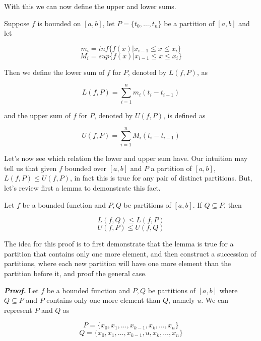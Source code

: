 \documentclass{report}
\begin{document}

    With this we can now define the upper and lower sums.

    \begin{defBox}
        Suppose $f$ is bounded on $[a,b]$, let $P = \{t_0,\dots,t_n\}$ be a partition of $[a,b]$ and let

        $$m_i = inf\{f(x) | x_{i-1} \leq x \leq x_i\}$$
        $$M_i = sup\{f(x) | x_{i-1} \leq x \leq x_i\}$$

        Then we define the lower sum of $f$ for $P$, denoted by $L(f, P)$, as

        $$L(f, P) = \sum_{i=1}^{n}m_i(t_{i} - t_{i-1})$$

        and the upper sum of $f$ for $P$, denoted by $U(f, P)$, is defined as

        $$U(f, P) = \sum_{i=1}^{n}M_i(t_{i} - t_{i-1})$$
    \end{defBox}


    Let's now see which relation the lower and upper sum have. Our intuition may tell us that given $f$ bounded over $[a,b]$ and $P$ a partition of $[a,b]$, $L(f, P) \leq U(f, P)$, in fact this is true for any pair of distinct partitions. But, let's review first a lemma to demonstrate this fact.

    \begin{lemBox}
        Let $f$ be a bounded function and $P, Q$ be partitions of $[a,b]$. If $Q \subseteq P$, then

        $$L(f, Q) \leq L(f, P) $$
        $$U(f, P) \leq U(f, Q) $$
    \end{lemBox}

    \begin{ideaBox}
        The idea for this proof is to first demonstrate that the lemma is true for a partition that contains only one more element, and then construct a succession of partitions, where each new partition will have one more element than the partition before it, and proof the general case.
    \end{ideaBox}

    \textit{\textbf{Proof.}} Let $f$ be a bounded function and $P, Q$ be partitions of $[a,b]$ where $Q \subseteq P$ and $P$ contains only one more element than $Q$, namely $u$. We can represent $P$ and $Q$ as

    $$P = \{x_0,x_1,\dots,x_{k-1},x_k,\dots,x_n\}$$
    $$Q = \{x_0,x_1,\dots,x_{k-1},u,x_k,\dots,x_n\}$$
\end{document}
